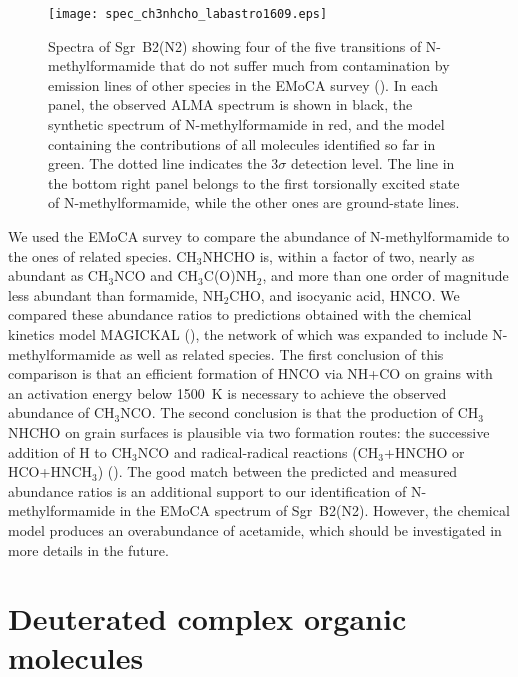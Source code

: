 \documentclass{iau}
\begin{document}
\begin{figure}
\begin{center}
\texttt{[image: spec\_ch3nhcho\_labastro1609.eps]}
\end{center}
\caption{Spectra of Sgr~B2(N2) showing four of the five transitions of 
N-methylformamide that do not suffer much from contamination by emission lines
of other species in the EMoCA survey (\cite{Belloche17}). In each panel, the 
observed ALMA spectrum is shown in black, the synthetic spectrum of 
N-methylformamide in red, 
and the model containing the contributions of all molecules identified so 
far in green. The dotted line indicates the $3\sigma$ detection level. The 
line in the bottom right panel belongs to the first torsionally excited state 
of N-methylformamide, while the other ones are ground-state lines.}
\label{f:spec_ch3nhcho}
\end{figure}

We used the EMoCA survey to compare the abundance of N-methylformamide to the
ones of related species. CH$_3$NHCHO is, within a factor of two,  
nearly as abundant as CH$_3$NCO and CH$_3$C(O)NH$_2$, and more than one order
of magnitude less abundant than formamide, NH$_2$CHO, and isocyanic acid, HNCO.
We compared these abundance ratios to predictions obtained with the chemical 
kinetics model MAGICKAL (\cite{Garrod13a}), the network of which was expanded
to include N-methylformamide as well as related species. The first conclusion
of this comparison is that an efficient formation of HNCO via NH+CO on grains
with an activation energy below 1500~K is necessary to achieve the observed 
abundance of CH$_3$NCO. The second conclusion is that the 
production of CH$_3$NHCHO on grain surfaces is plausible via two formation 
routes: the successive addition of H to CH$_3$NCO and radical-radical reactions 
(CH$_3$+HNCHO or HCO+HNCH$_3$) (\cite{Belloche17}). The good match between
the predicted and measured abundance ratios is an additional support to our
identification of N-methylformamide in the EMoCA spectrum of Sgr~B2(N2). 
However, the chemical model produces an overabundance of acetamide, which
should be investigated in more details in the future.

\section{Deuterated complex organic molecules}
\end{document}
